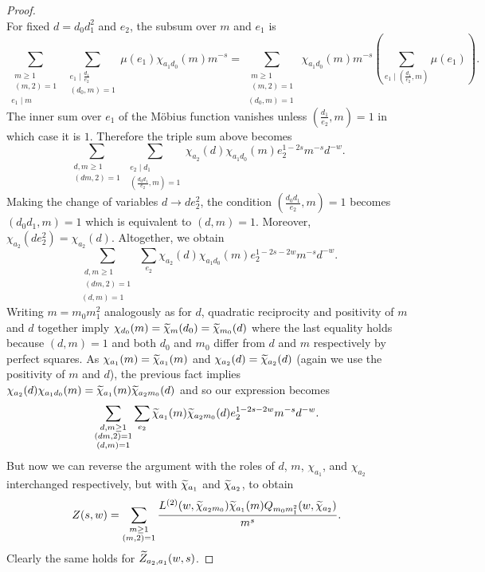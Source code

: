 \begin{proof}
\[        \]
        For fixed $d = d_{0}d_{1}^{2}$ and $e_{2}$, the subsum over $m$ and $e_{1}$ is
        \[
            \sum_{\substack{\substack{m \ge 1 \\ (m,2) = 1} \\ e_{1} \mid m}}\sum_{\substack{e_{1} \mid \frac{d_{1}}{e_{2}} \\ (d_{0},m) = 1}}\mu(e_{1})\chi_{a_{1}d_{0}}(m)m^{-s} = \sum_{\substack{\substack{m \ge 1 \\ (m,2) = 1} \\ (d_{0},m) = 1}}\chi_{a_{1}d_{0}}(m)m^{-s}\left(\sum_{e_{1} \mid \left(\frac{d_{1}}{e_{2}},m\right)}\mu(e_{1})\right).
        \]
        The inner sum over $e_{1}$ of the M\"obius function vanishes unless $\left(\frac{d_{1}}{e_{2}},m\right) = 1$ in which case it is $1$. Therefore the triple sum above becomes
        \[
            \sum_{\substack{d,m \ge 1 \\ (dm,2) = 1}}\sum_{\substack{e_{2} \mid d_{1} \\ \left(\frac{d_{0}d_{1}}{e_{2}},m\right) = 1}}\chi_{a_{2}}(d)\chi_{a_{1}d_{0}}(m)e_{2}^{1-2s}m^{-s}d^{-w}.
        \]
        Making the change of variables $d \to de_{2}^{2}$, the condition $\left(\frac{d_{0}d_{1}}{e_{2}},m\right) = 1$ becomes $(d_{0}d_{1},m) = 1$ which is equivalent to $(d,m) = 1$. Moreover, $\chi_{a_{2}}(de_{2}^{2}) = \chi_{a_{2}}(d)$. Altogether, we obtain
        \[
            \sum_{\substack{\substack{d,m \ge 1 \\ (dm,2) = 1} \\ (d,m) = 1}}\sum_{e_{2}}\chi_{a_{2}}(d)\chi_{a_{1}d_{0}}(m)e_{2}^{1-2s-2w}m^{-s}d^{-w}.
        \]
        Writing $m = m_{0}m_{1}^{2}$ analogously as for $d$, quadratic reciprocity and positivity of $m$ and $d$ together imply $\chi_{d_{0}}(m) = \widetilde{\chi}_{m}(d_{0}) = \widetilde{\chi}_{m_{0}}(d)$ where the last equality holds because $(d,m) = 1$ and both $d_{0}$ and $m_{0}$ differ from $d$ and $m$ respectively by perfect squares. As $\chi_{a_{1}}(m) = \widetilde{\chi}_{a_{1}}(m)$ and $\chi_{a_{2}}(d) = \widetilde{\chi}_{a_{2}}(d)$ (again we use the positivity of $m$ and $d$), the previous fact implies $\chi_{a_{2}}(d)\chi_{a_{1}d_{0}}(m) = \widetilde{\chi}_{a_{1}}(m)\widetilde{\chi}_{a_{2}m_{0}}(d)$ and so our expression becomes
        \[
            \sum_{\substack{\substack{d,m \ge 1 \\ (dm,2) = 1} \\ (d,m) = 1}}\sum_{e_{2}}\widetilde{\chi}_{a_{1}}(m)\widetilde{\chi}_{a_{2}m_{0}}(d)e_{2}^{1-2s-2w}m^{-s}d^{-w}.
        \]
        But now we can reverse the argument with the roles of $d$, $m$, $\chi_{a_{1}}$, and $\chi_{a_{2}}$ interchanged respectively, but with $\widetilde{\chi}_{a_{1}}$ and $\widetilde{\chi}_{a_{2}}$, to obtain
        \[
            Z(s,w) = \sum_{\substack{m \ge 1 \\ (m,2) = 1}}\frac{L^{(2)}(w,\widetilde{\chi}_{a_{2}m_{0}})\widetilde{\chi}_{a_{1}}(m)Q_{m_{0}m_{1}^{2}}(w,\widetilde{\chi}_{a_{2}})}{m^{s}}.
        \]
        Clearly the same holds for $\widetilde{Z}_{a_{2},a_{1}}(w,s)$.
    \end{proof}


